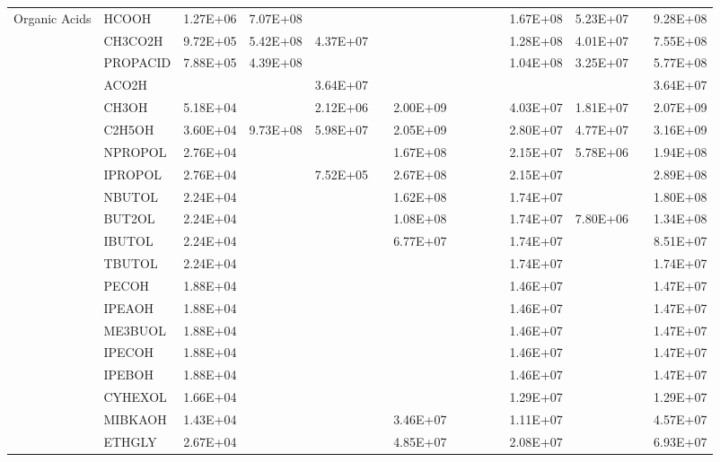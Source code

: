 \begin{longtable}{lllllllllllllll}
	\hline \multirow{4}{*}{Organic Acids} & HCOOH & 1.27E+06 & 7.07E+08 &  &  &  &  &  &  &  & 1.67E+08 & 5.23E+07 &  & 9.28E+08 \\
	 & CH3CO2H & 9.72E+05 & 5.42E+08 & 4.37E+07 &  &  &  &  &  &  & 1.28E+08 & 4.01E+07 &  & 7.55E+08 \\
	 & PROPACID & 7.88E+05 & 4.39E+08 &  &  &  &  &  &  &  & 1.04E+08 & 3.25E+07 &  & 5.77E+08 \\
	 & ACO2H &  &  & 3.64E+07 &  &  &  &  &  &  &  &  &  & 3.64E+07 \\
	\hline \parbox[t]{2mm}{} & CH3OH & 5.18E+04 &  & 2.12E+06 &  & 2.00E+09 &  &  &  &  & 4.03E+07 & 1.81E+07 &  & 2.07E+09 \\*
	 & C2H5OH & 3.60E+04 & 9.73E+08 & 5.98E+07 &  & 2.05E+09 &  &  &  &  & 2.80E+07 & 4.77E+07 &  & 3.16E+09 \\*
	 & NPROPOL & 2.76E+04 &  &  &  & 1.67E+08 &  &  &  &  & 2.15E+07 & 5.78E+06 &  & 1.94E+08 \\*
	 & IPROPOL & 2.76E+04 &  & 7.52E+05 &  & 2.67E+08 &  &  &  &  & 2.15E+07 &  &  & 2.89E+08 \\*
	 & NBUTOL & 2.24E+04 &  &  &  & 1.62E+08 &  &  &  &  & 1.74E+07 &  &  & 1.80E+08 \\
	 & BUT2OL & 2.24E+04 &  &  &  & 1.08E+08 &  &  &  &  & 1.74E+07 & 7.80E+06 &  & 1.34E+08 \\
	 & IBUTOL & 2.24E+04 &  &  &  & 6.77E+07 &  &  &  &  & 1.74E+07 &  &  & 8.51E+07 \\
	 & TBUTOL & 2.24E+04 &  &  &  &  &  &  &  &  & 1.74E+07 &  &  & 1.74E+07 \\
	 & PECOH & 1.88E+04 &  &  &  &  &  &  &  &  & 1.46E+07 &  &  & 1.47E+07 \\
	 & IPEAOH & 1.88E+04 &  &  &  &  &  &  &  &  & 1.46E+07 &  &  & 1.47E+07 \\
	 & ME3BUOL & 1.88E+04 &  &  &  &  &  &  &  &  & 1.46E+07 &  &  & 1.47E+07 \\
	 & IPECOH & 1.88E+04 &  &  &  &  &  &  &  &  & 1.46E+07 &  &  & 1.47E+07 \\
	 & IPEBOH & 1.88E+04 &  &  &  &  &  &  &  &  & 1.46E+07 &  &  & 1.47E+07 \\
	 & CYHEXOL & 1.66E+04 &  &  &  &  &  &  &  &  & 1.29E+07 &  &  & 1.29E+07 \\
	 & MIBKAOH & 1.43E+04 &  &  &  & 3.46E+07 &  &  &  &  & 1.11E+07 &  &  & 4.57E+07 \\
	 & ETHGLY & 2.67E+04 &  &  &  & 4.85E+07 &  &  &  &  & 2.08E+07 &  &  & 6.93E+07 \\

\end{longtable}
